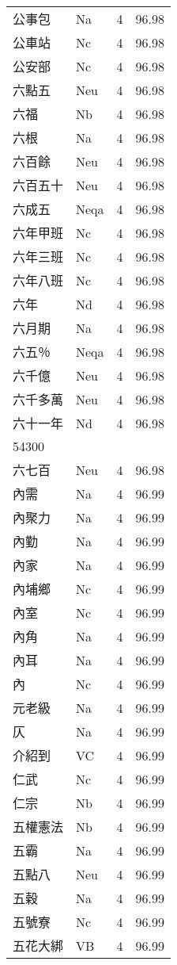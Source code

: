 \documentclass[twocolumn]{book}
\begin{document}
\begin{supertabular}{llrr}
公事包 & Na & 4 &  96.98\\
公車站 & Nc & 4 &  96.98\\
公安部 & Nc & 4 &  96.98\\
六點五 & Neu & 4 &  96.98\\
六福 & Nb & 4 &  96.98\\
六根 & Na & 4 &  96.98\\
六百餘 & Neu & 4 &  96.98\\
六百五十 & Neu & 4 &  96.98\\
六成五 & Neqa & 4 &  96.98\\
六年甲班 & Nc & 4 &  96.98\\
六年三班 & Nc & 4 &  96.98\\
六年八班 & Nc & 4 &  96.98\\
六年 & Nd & 4 &  96.98\\
六月期 & Na & 4 &  96.98\\
六五％ & Neqa & 4 &  96.98\\
六千億 & Neu & 4 &  96.98\\
六千多萬 & Neu & 4 &  96.98\\
六十一年 & Nd & 4 &  96.98\\
54300\\
六七百 & Neu & 4 &  96.98\\
內需 & Na & 4 &  96.99\\
內聚力 & Na & 4 &  96.99\\
內勤 & Na & 4 &  96.99\\
內家 & Na & 4 &  96.99\\
內埔鄉 & Nc & 4 &  96.99\\
內室 & Nc & 4 &  96.99\\
內角 & Na & 4 &  96.99\\
內耳 & Na & 4 &  96.99\\
內 & Nc & 4 &  96.99\\
元老級 & Na & 4 &  96.99\\
仄 & Na & 4 &  96.99\\
介紹到 & VC & 4 &  96.99\\
仁武 & Nc & 4 &  96.99\\
仁宗 & Nb & 4 &  96.99\\
五權憲法 & Nb & 4 &  96.99\\
五霸 & Na & 4 &  96.99\\
五點八 & Neu & 4 &  96.99\\
五穀 & Na & 4 &  96.99\\
五號寮 & Nc & 4 &  96.99\\
五花大綁 & VB & 4 &  96.99\\

\end{supertabular}
\end{document}
